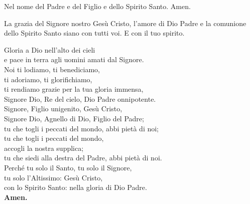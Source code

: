 \documentclass[11pt]{book}
\begin{document}
{%
    \hspace{0pt}
    \vfill
    \begin{center}
    
    \end{center}
    \vfill
    \hspace{0pt}
}
\clearpage
{}
{%
    \hspace{0pt}
    \vfill
    \begin{center}
    
    \end{center}
    \vfill
    \hspace{0pt}
}

\restoregeometry


\celebrante
{Nel nome del Padre e del Figlio e dello Spirito Santo.}
{Amen.}

\celebrante
{La grazia del Signore nostro Gesù Cristo, l'amore di Dio Padre e
la comunione dello Spirito Santo siano con tutti voi.}
{E con il tuo spirito.}

\vspace{15pt}


\introduzione[2]

\memoriaDelBattesimo

\settowidth{\versewidth}{Signore Dio, Re del cielo, Dio Padre onnipotente.}
\begin{canzone}[\versewidth]
Gloria a Dio nell'alto dei cieli\\
e pace in terra agli uomini amati dal Signore.\\
Noi ti lodiamo, ti benediciamo,\\
ti adoriamo, ti glorifichiamo,\\
ti rendiamo grazie per la tua gloria immensa,\\
Signore Dio, Re del cielo, Dio Padre onnipotente.\\
Signore, Figlio unigenito, Gesù Cristo,\\
Signore Dio, Agnello di Dio, Figlio del Padre;\\
tu che togli i peccati del mondo, abbi pietà di noi;\\
tu che togli i peccati del mondo,\\
accogli la nostra supplica;\\
tu che siedi alla destra del Padre, abbi pietà di noi.\\
Perché tu solo il Santo, tu solo il Signore,\\
tu solo l’Altissimo: Gesù Cristo,\\
con lo Spirito Santo: nella gloria di Dio Padre.\\
\textbf{Amen.}
\end{canzone}
\end{document}
